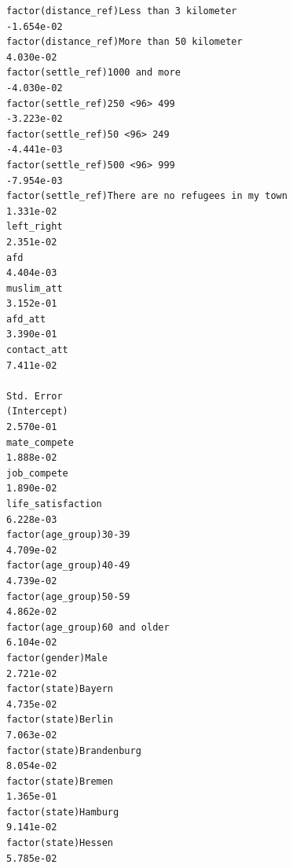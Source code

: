 \documentclass[
]{article}
\begin{document}
\begin{table}
\begin{minipage}[t]{\linewidth}
{\begin{verbatim}
factor(distance_ref)Less than 3 kilometer                                         -1.654e-02
factor(distance_ref)More than 50 kilometer                                         4.030e-02
factor(settle_ref)1000 and more                                                   -4.030e-02
factor(settle_ref)250 <96> 499                                                    -3.223e-02
factor(settle_ref)50 <96> 249                                                     -4.441e-03
factor(settle_ref)500 <96> 999                                                    -7.954e-03
factor(settle_ref)There are no refugees in my town                                 1.331e-02
left_right                                                                         2.351e-02
afd                                                                                4.404e-03
muslim_att                                                                         3.152e-01
afd_att                                                                            3.390e-01
contact_att                                                                        7.411e-02
                                                                                  Std. Error
(Intercept)                                                                        2.570e-01
mate_compete                                                                       1.888e-02
job_compete                                                                        1.890e-02
life_satisfaction                                                                  6.228e-03
factor(age_group)30-39                                                             4.709e-02
factor(age_group)40-49                                                             4.739e-02
factor(age_group)50-59                                                             4.862e-02
factor(age_group)60 and older                                                      6.104e-02
factor(gender)Male                                                                 2.721e-02
factor(state)Bayern                                                                4.735e-02
factor(state)Berlin                                                                7.063e-02
factor(state)Brandenburg                                                           8.054e-02
factor(state)Bremen                                                                1.365e-01
factor(state)Hamburg                                                               9.141e-02
factor(state)Hessen                                                                5.785e-02

\end{verbatim}}
\end{minipage}
\end{table}
\end{document}

